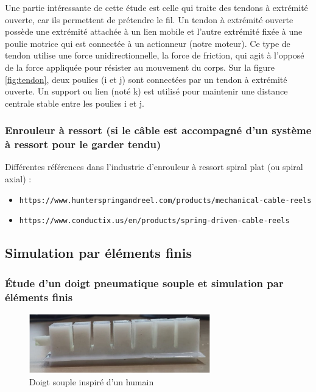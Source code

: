 \documentclass[a4paper, 11pt]{report}
\begin{document}
            Une partie intéressante de cette étude est celle qui traite des tendons à extrémité ouverte, car ils permettent de prétendre le fil. Un tendon à extrémité ouverte possède une extrémité attachée à un lien mobile et l'autre extrémité fixée à une poulie motrice qui est connectée à un actionneur (notre moteur). Ce type de tendon utilise une force unidirectionnelle, la force de friction, qui agit à l'opposé de la force appliquée pour résister au mouvement du corps. Sur la figure \ref{fig:tendon}, deux poulies (i et j) sont connectées par un tendon à extrémité ouverte. Un support ou lien (noté k) est utilisé pour maintenir une distance centrale stable entre les poulies i et j. \cite{saputro_investigation_2023}

        \subsubsection{Enrouleur à ressort (si le câble est accompagné d’un système à ressort pour le garder tendu)}
            
            Différentes références dans l'industrie d'enrouleur à ressort spiral plat (ou spiral axial) :
            \begin{itemize}
                \item \texttt{https://www.hunterspringandreel.com/products/mechanical-cable-reels}
                \item \texttt{https://www.conductix.us/en/products/spring-driven-cable-reels}
            \end{itemize}

    \subsection{Simulation par éléments finis}

        \subsubsection{Étude d'un doigt pneumatique souple et simulation par éléments finis}

            \begin{figure}
                \centering
                \includegraphics[width=0.7\textwidth]{Figures/doigt_souple.jpg}
                \caption{Doigt souple inspiré d'un humain \cite{bhat_numerical_2025}}
                \label{fig:doigt_souple}
            \end{figure}
\end{document}
